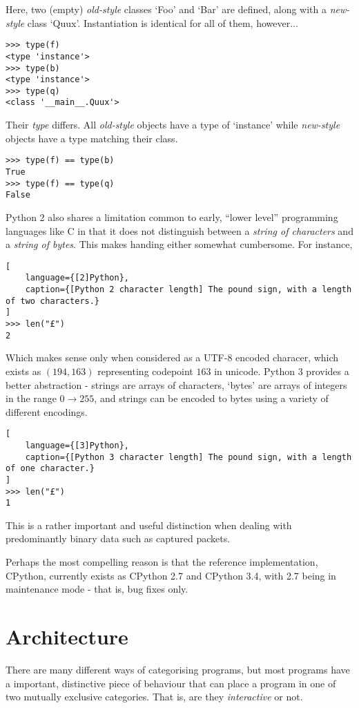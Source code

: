 \documentclass[10pt,a4paper,notitlepage]{report}
\begin{document}
Here, two (empty) \emph{old-style} classes `Foo' and `Bar' are defined, along with a \emph{new-style} class `Quux'. Instantiation is identical for all of them, however...

\begin{lstlisting}[language={[2]Python}]
>>> type(f)
<type 'instance'>
>>> type(b)
<type 'instance'>
>>> type(q)
<class '__main__.Quux'>
\end{lstlisting}

Their \emph{type} differs. All \emph{old-style} objects have a type of `instance' while \emph{new-style} objects have a type matching their class.

\begin{lstlisting}[language={[2]Python}]
>>> type(f) == type(b)
True
>>> type(f) == type(q)
False
\end{lstlisting}

Python 2 also shares a limitation common to early, ``lower level'' programming languages like C in that it does not distinguish between a \emph{string of characters} and a \emph{string of bytes}.
This makes handing either somewhat cumbersome. For instance,

\begin{lstlisting}[
    language={[2]Python},
    caption={[Python 2 character length] The pound sign, with a length of two characters.}
]
>>> len("£")
2
\end{lstlisting}

Which makes sense only when considered as a UTF-8 encoded characer, which exists as $(194, 163)$ representing codepoint $163$ in unicode.
Python 3 provides a better abstraction - strings are arrays of characters, `bytes' are arrays of integers in the range $0 \rightarrow 255$, and strings can be encoded to bytes using a variety of different encodings.

\begin{lstlisting}[
    language={[3]Python},
    caption={[Python 3 character length] The pound sign, with a length of one character.}
]
>>> len("£")
1
\end{lstlisting}

This is a rather important and useful distinction when dealing with predominantly binary data such as captured packets.

Perhaps the most compelling reason is that the reference implementation, CPython, currently exists as CPython 2.7 and CPython 3.4, with 2.7 being in maintenance mode\cite{cpy2maint} - that is, bug fixes only.

\section{Architecture}
There are many different ways of categorising programs, but most programs have a important, distinctive piece of behaviour that can place a program in one of two mutually exclusive categories. That is, are they \emph{interactive} or not.
\end{document}
